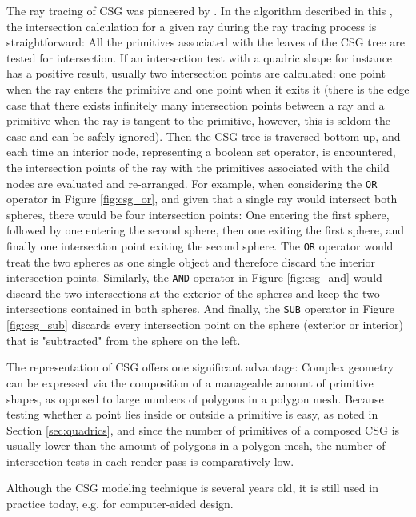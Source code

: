 The ray tracing of CSG was pioneered by \cite{roth1982ray}. In the algorithm described in this , the intersection calculation for a given ray during the ray tracing process is straightforward: 
All the primitives associated with the leaves of the CSG tree are tested for intersection. If an intersection test with a quadric shape for instance has a positive result, usually two intersection points are calculated: one point when the ray enters the primitive and one point when it exits it (there is the edge case that there exists infinitely many intersection points between a ray and a primitive when the ray is tangent to the primitive, however, this is seldom the case and can be safely ignored). Then the CSG tree is traversed bottom up, and each time an interior node, representing a boolean set operator, is encountered, the intersection points of the ray with the primitives associated with the child nodes are evaluated and re-arranged. For example, when considering the \texttt{OR} operator in Figure \ref{fig:csg_or}, and given that a single ray would intersect both spheres, there would be four intersection points: One entering the first sphere, followed by one entering the second sphere, then one exiting the first sphere, and finally one intersection point exiting the second sphere. The \texttt{OR} operator would treat the two spheres as one single object and therefore discard the interior intersection points. Similarly, the \texttt{AND} operator in Figure \ref{fig:csg_and} would discard the two intersections at the exterior of the spheres and keep the two intersections contained in both spheres.
And finally, the \texttt{SUB} operator in Figure \ref{fig:csg_sub} discards every intersection point on the sphere (exterior or interior) that is "subtracted" from the sphere on the left.

The representation of CSG offers one significant advantage: Complex geometry can be expressed via the composition of a manageable amount of primitive shapes, as opposed to large numbers of polygons in a polygon mesh. Because testing whether a point lies inside or outside a primitive is easy, as noted in Section \ref{sec:quadrics}, and since the number of primitives of a composed CSG is usually lower than the amount of polygons in a polygon mesh, the number of intersection tests in each render pass is comparatively low.

Although the CSG modeling technique is several years old, it is still used in practice today, e.g. for computer-aided design.


